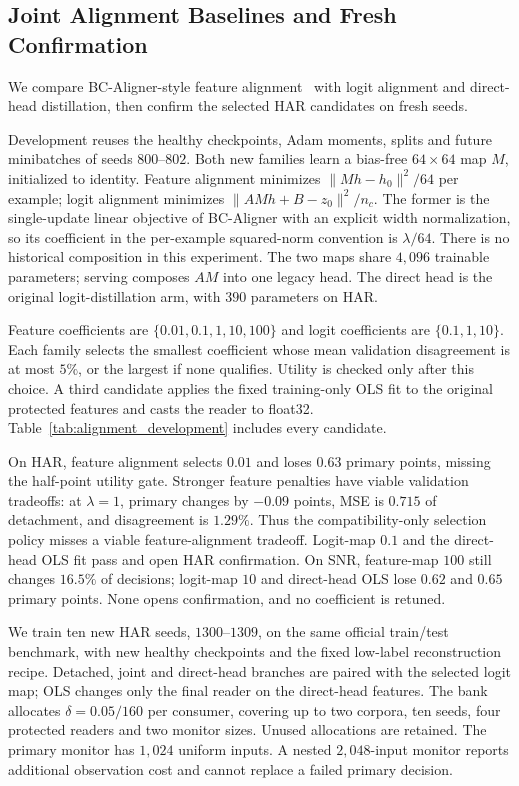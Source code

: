 \subsection{Joint Alignment Baselines and Fresh Confirmation}\label{app:alignment_confirmation}

We compare BC-Aligner-style feature alignment~\citep{hu2022backward} with
logit alignment and direct-head distillation, then confirm the selected
HAR candidates on fresh seeds.

Development reuses the healthy checkpoints, Adam moments, splits and future
minibatches of seeds $800$--$802$. Both new families learn a bias-free
$64\times64$ map $M$, initialized to identity. Feature alignment minimizes
$\|Mh-h_0\|^2/64$ per example; logit alignment minimizes
$\|AMh+B-z_0\|^2/n_c$. The former is the single-update linear objective of
BC-Aligner with an explicit width normalization, so its coefficient in the
per-example squared-norm convention is $\lambda/64$. There is no historical
composition in this experiment. The two maps share $4{,}096$ trainable
parameters; serving composes $AM$ into one legacy head. The direct head is the
original logit-distillation arm, with $390$ parameters on HAR.

Feature coefficients are $\{0.01,0.1,1,10,100\}$ and logit coefficients are
$\{0.1,1,10\}$. Each family selects the smallest coefficient whose mean
validation disagreement is at most $5\%$, or the largest if none qualifies.
Utility is checked only after this choice. A third candidate applies the fixed
training-only OLS fit to the original protected features and casts the reader
to float32. Table~\ref{tab:alignment_development} includes every candidate.



On HAR, feature alignment selects $0.01$ and loses $0.63$ primary points,
missing the half-point utility gate. Stronger feature penalties have viable
validation tradeoffs: at $\lambda=1$, primary changes by $-0.09$ points, MSE
is $0.715$ of detachment, and disagreement is $1.29\%$. Thus the compatibility-only selection policy misses a viable
feature-alignment tradeoff. Logit-map $0.1$ and the direct-head OLS fit pass and open HAR
confirmation. On SNR, feature-map $100$ still changes $16.5\%$ of decisions;
logit-map $10$ and direct-head OLS lose $0.62$ and $0.65$ primary points.
None opens confirmation, and no coefficient is retuned.

We train ten new HAR seeds, $1300$--$1309$, on the same official train/test
benchmark, with new healthy checkpoints and the fixed low-label reconstruction
recipe. Detached, joint and direct-head branches are paired with the selected
logit map; OLS changes only the final reader on the direct-head features.
The bank allocates $\delta=0.05/160$ per consumer, covering up to two corpora,
ten seeds, four protected readers and two monitor sizes. Unused allocations
are retained. The primary monitor has $1{,}024$ uniform inputs. A nested
$2{,}048$-input monitor reports additional observation cost and cannot replace
a failed primary decision.

